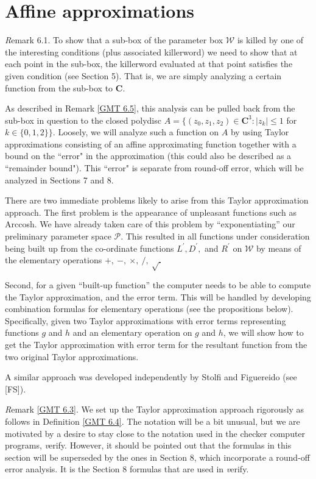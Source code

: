 \chapter{Affine approximations}

 
{\textit Remark} 6.1.
To show that a sub-box of the parameter box ${\mathcal W}$ is killed by one of the interesting conditions (plus associated killerword) we need to show that at each point in the sub-box, the killerword evaluated at that point satisfies the given condition (see
Section 5).  That is, we are simply analyzing a certain function from the sub-box to ${\mathbf C}$.  

As described in Remark \ref{GMT 6.5}, this analysis can be pulled back from the sub-box in question to the closed polydisc 
$A = \{(z_0,z_1,z_2) \in {\mathbf C}^3 : |z_k| \le 1$  for $k \in \{0,1,2\}\}.$  
Loosely,  we will analyze such a function on $A$ by using  Taylor approximations consisting of an affine approximating
function together with a bound on the ``error" in the approximation (this could also be described as a ``remainder bound").  This ``error" 
is separate from round-off error,  which will be analyzed in Sections 7 and 8.  

There are two immediate problems likely to arise from this Taylor approximation approach.
The first problem is the appearance of unpleasant functions such as 
Arccosh.  We have already taken care of this problem by ``exponentiating'' our preliminary parameter space ${\mathcal P}$.  This resulted in all functions under consideration being built up from the co-ordinate functions $ L^{\prime}, D^{\prime},$ and $ R^{\prime}$ on ${\mathcal W}$ by means of the elementary operations $+,\ -,\ \times,\ /,\ \sqrt.$ 

Second,  for a given ``built-up function'' the computer needs to be able to compute the Taylor approximation, and the error term.  This will be handled 
by developing combination formulas for elementary operations (see the propositions below).  Specifically, given two Taylor
approximations with error terms representing functions $g$ and $h$ and an elementary operation on $g$ and $h$, we will show how to
get the Taylor approximation with error term for the resultant function from the two original Taylor approximations. 

A similar approach was developed independently by Stolfi and Figuereido (see [FS]).

{\textit Remark} \ref{GMT 6.3}.
We set up the Taylor approximation approach rigorously
as follows in Definition \ref{GMT 6.4}.
The notation will be a bit unusual, but we are motivated by a desire to stay close to the notation used in the checker computer programs, {\textit verify}.  However, it should be pointed out that the formulas in this
section will be superseded by the ones in Section 8, which incorporate a round-off error analysis.  It is the Section 8 formulas that are
used in {\textit verify}.

